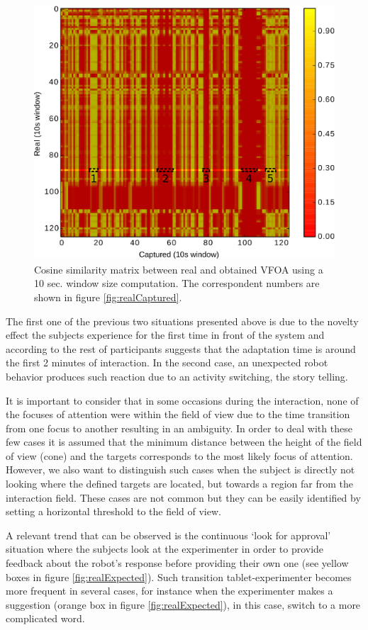 \documentclass{sig-alternate}
\begin{document}
\begin{figure}[h!]
    \centering
    \includegraphics[width=0.8\columnwidth]{bitmap}
    \caption{\small Cosine similarity matrix between real and obtained VFOA using a 10 sec. window size computation. The correspondent numbers are shown in figure \ref{fig:realCaptured}.}
    \label{fig:bitmap}
\end{figure}

The first one of the previous two situations presented above is due to the novelty effect the subjects experience for the first time in front of the system and according to the rest of participants suggests that the adaptation time is around the first 2 minutes of interaction. In the second case, an unexpected robot behavior produces such reaction due to an activity switching, the story telling.

It is important to consider that in some occasions during the interaction, none of the focuses of attention were within the field of view due to the time transition from one focus to another resulting in an ambiguity. In order to deal with these few cases it is assumed that the minimum distance between the height of the field of view (cone) and the targets corresponds to the most likely focus of attention. However, we also want to distinguish such cases when the subject is directly not looking where the defined targets are located, but towards a region far from the interaction field. These cases are not common but they can be easily identified by setting a horizontal threshold to the field of view.

A relevant trend that can be observed is the continuous `look for approval' situation where the subjects look at the experimenter in order to provide feedback about the robot's response before providing their own one (see yellow boxes in figure \ref{fig:realExpected}). Such transition tablet-experimenter becomes more frequent in several cases, for instance when the experimenter makes a suggestion (orange box in figure \ref{fig:realExpected}), in this case, switch to a more complicated word.
\end{document}
